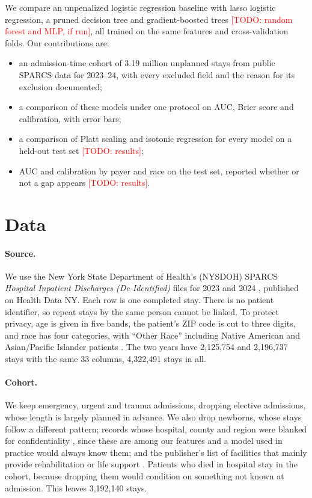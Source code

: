 \documentclass{article}
\newcommand{\todo}[1]{\textcolor{red}{[TODO: #1]}}
\begin{document}
We compare an unpenalized logistic regression baseline with lasso logistic
regression, a pruned decision tree and gradient-boosted trees
\todo{random forest and MLP, if run}, all trained on the
same features and cross-validation folds. Our contributions are:
\begin{itemize}
  \item an admission-time cohort of 3.19 million unplanned stays from public
        SPARCS data for 2023--24, with every excluded field and the reason
        for its exclusion documented;
  \item a comparison of these models under one protocol on AUC, Brier score
        and calibration, with error bars;
  \item a comparison of Platt scaling and isotonic regression for every
        model on a held-out test set \todo{results};
  \item AUC and calibration by payer and race on the test set, reported
        whether or not a gap appears \todo{results}.
\end{itemize}

\section{Data}
\label{sec:data}

\paragraph{Source.}
We use the New York State Department of Health's (NYSDOH) SPARCS \emph{Hospital
Inpatient Discharges (De-Identified)} files for 2023 and 2024
\citep{sparcs}, published on Health Data NY.
Each row is one completed stay. There is no patient identifier, so repeat
stays by the same person cannot be linked. To protect privacy, age is given in
five bands, the patient's ZIP code is cut to three digits, and race has four
categories, with ``Other Race'' including Native American and Asian/Pacific
Islander patients \citep{sparcs}. The two years have
2{,}125{,}754 and 2{,}196{,}737 stays with the same 33 columns, 4{,}322{,}491
stays in all.

\paragraph{Cohort.}
We keep emergency, urgent and trauma admissions, dropping elective
admissions, whose length is largely planned in advance. We also drop
newborns, whose stays follow a different pattern; records whose hospital,
county and region were blanked for confidentiality
\citep{sparcs}, since these are among our features and a model
used in practice would always know them; and the publisher's list of facilities that mainly provide
rehabilitation or life support \citep{sparcs}. Patients who died
in hospital stay in the cohort, because dropping them would condition on
something not known at admission. This leaves 3{,}192{,}140 stays.
\end{document}
